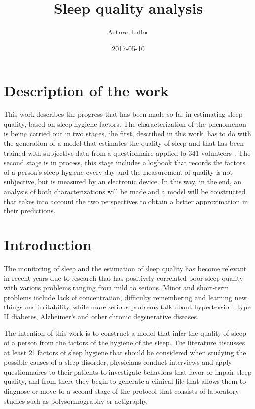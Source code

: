 \documentclass[]{book}
\title{Sleep quality analysis}
\author{Arturo Laflor}
\date{2017-05-10}
\begin{document}
\maketitle

{
\setcounter{tocdepth}{1}
\tableofcontents
}
\chapter{Description of the work}\label{description-of-the-work}

This work describes the progress that has been made so far in estimating
sleep quality, based on sleep hygiene factors. The characterization of
the phenomenon is being carried out in two stages, the first, described
in this work, has to do with the generation of a model that estimates
the quality of sleep and that has been trained with subjective data from
a questionnaire applied to 341 volunteers . The second stage is in
process, this stage includes a logbook that records the factors of a
person's sleep hygiene every day and the measurement of quality is not
subjective, but is measured by an electronic device. In this way, in the
end, an analysis of both characterizations will be made and a model will
be constructed that takes into account the two perspectives to obtain a
better approximation in their predictions.

\chapter{Introduction}\label{intro}

The monitoring of sleep and the estimation of sleep quality has become
relevant in recent years due to research that has positively correlated
poor sleep quality with various problems ranging from mild to serious.
Minor and short-term problems include lack of concentration, difficulty
remembering and learning new things and irritability, while more serious
problems talk about hypertension, type II diabetes, Alzheimer's and
other chronic degenerative diseases.

The intention of this work is to construct a model that infer the
quality of sleep of a person from the factors of the hygiene of the
sleep. The literature discusses at least 21 factors of sleep hygiene
that should be considered when studying the possible causes of a sleep
disorder, physicians conduct interviews and apply questionnaires to
their patients to investigate behaviors that favor or impair sleep
quality, and from there they begin to generate a clinical file that
allows them to diagnose or move to a second stage of the protocol that
consists of laboratory studies such as polysomnography or actigraphy.
\end{document}
